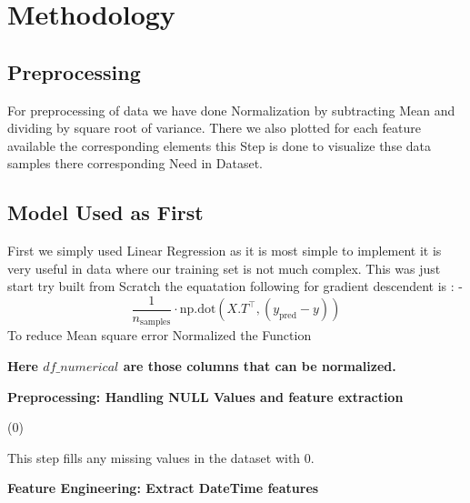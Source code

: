 \documentclass{IEEEtran}
\begin{document}
\clearpage

\section{Methodology}
\subsection{Preprocessing}
For preprocessing of data we have done Normalization by subtracting Mean and dividing by square root of variance. There we also plotted for each feature available the corresponding elements this Step is done to visualize thse data samples there corresponding Need in Dataset.

\subsection{Model Used as First}
First we simply used Linear Regression as it is most simple to implement it is very useful in data where our training set is not much complex. This was just start try built from Scratch \newline
the equatation following for gradient descendent is : - 
\[
\frac{1}{n_{\text{samples}}} \cdot \text{np.dot}(X.T^\intercal, (y_{\text{pred}} - y))
\]
\newline
To reduce Mean square error Normalized the Function \newline
{} \leftarrow {} \newline

\textbf{Here $df\_numerical$ are those columns that can be normalized.}

\textbf{Preprocessing: Handling NULL Values and feature extraction}

(0)

 This step fills any missing values in the dataset with 0.

\textbf{Feature Engineering: Extract DateTime features}

 \leftarrow {}

 \leftarrow {}

 \leftarrow {}

 \leftarrow {}
\end{document}
